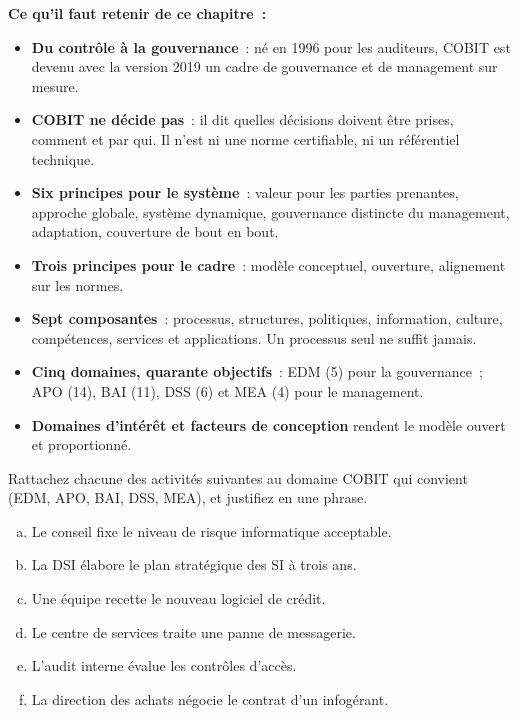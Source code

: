 \separateur

\begin{boxresume}
\textbf{Ce qu'il faut retenir de ce chapitre~:}
\begin{itemize}
    \item \textbf{Du contrôle à la gouvernance}~: né en 1996 pour les
          auditeurs, COBIT est devenu avec la version 2019 un cadre de
          gouvernance et de management sur mesure.
    \item \textbf{COBIT ne décide pas}~: il dit quelles décisions doivent
          être prises, comment et par qui. Il n'est ni une norme
          certifiable, ni un référentiel technique.
    \item \textbf{Six principes pour le système}~: valeur pour les parties
          prenantes, approche globale, système dynamique, gouvernance
          distincte du management, adaptation, couverture de bout en bout.
    \item \textbf{Trois principes pour le cadre}~: modèle conceptuel,
          ouverture, alignement sur les normes.
    \item \textbf{Sept composantes}~: processus, structures, politiques,
          information, culture, compétences, services et applications. Un
          processus seul ne suffit jamais.
    \item \textbf{Cinq domaines, quarante objectifs}~: EDM (5) pour la
          gouvernance~; APO (14), BAI (11), DSS (6) et MEA (4) pour le
          management.
    \item \textbf{Domaines d'intérêt et facteurs de conception} rendent le
          modèle ouvert et proportionné.
\end{itemize}
\end{boxresume}

\bigskip

\begin{boxexo}[title={\ding{45}\quad Exercice~5.1. Classer par domaine \niveaubase}]
Rattachez chacune des activités suivantes au domaine COBIT qui convient
(EDM, APO, BAI, DSS, MEA), et justifiez en une phrase.
\begin{enumerate}[(a)]
    \item Le conseil fixe le niveau de risque informatique acceptable.
    \item La DSI élabore le plan stratégique des SI à trois ans.
    \item Une équipe recette le nouveau logiciel de crédit.
    \item Le centre de services traite une panne de messagerie.
    \item L'audit interne évalue les contrôles d'accès.
    \item La direction des achats négocie le contrat d'un infogérant.
\end{enumerate}
\end{boxexo}

